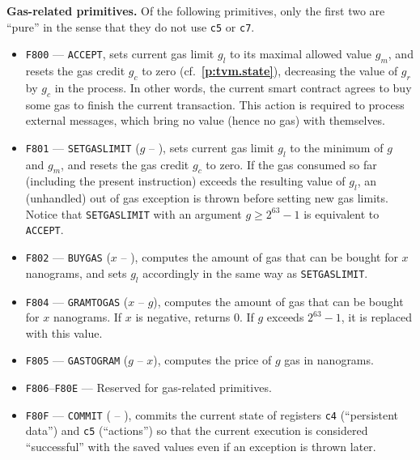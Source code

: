\documentclass[12pt,oneside]{article}
\def\makepoint#1{\medbreak\noindent{\bf #1.\ }}
\def\nxsubpoint{\refstepcounter{subsubsection}%
  \smallbreak\makepoint{\thesubsubsection}}
\def\refpoint#1{{\rm\textbf{\ref{#1}}}}
\let\ptref=\refpoint
\def\emb#1{\textbf{#1.}}
\begin{document}
\nxsubpoint\emb{Gas-related primitives}
Of the following primitives, only the first two are ``pure'' in the sense that they do not use {\tt c5} or {\tt c7}.
\begin{itemize}
\item {\tt F800} --- {\tt ACCEPT}, sets current gas limit $g_l$ to its maximal allowed value $g_m$, and resets the gas credit $g_c$ to zero (cf.~\ptref{p:tvm.state}), decreasing the value of $g_r$ by $g_c$ in the process. In other words, the current smart contract agrees to buy some gas to finish the current transaction. This action is required to process external messages, which bring no value (hence no gas) with themselves.
\item {\tt F801} --- {\tt SETGASLIMIT} ($g$ -- ), sets current gas limit $g_l$ to the minimum of $g$ and $g_m$, and resets the gas credit $g_c$ to zero. If the gas consumed so far (including the present instruction) exceeds the resulting value of $g_l$, an (unhandled) out of gas exception is thrown before setting new gas limits. Notice that {\tt SETGASLIMIT} with an argument $g\geq 2^{63}-1$ is equivalent to {\tt ACCEPT}.
\item {\tt F802} --- {\tt BUYGAS} ($x$ -- ), computes the amount of gas that can be bought for $x$ nanograms, and sets $g_l$ accordingly in the same way as {\tt SETGASLIMIT}.
\item {\tt F804} --- {\tt GRAMTOGAS} ($x$ -- $g$), computes the amount of gas that can be bought for $x$ nanograms. If $x$ is negative, returns 0. If $g$ exceeds $2^{63}-1$, it is replaced with this value.
\item {\tt F805} --- {\tt GASTOGRAM} ($g$ -- $x$), computes the price of $g$ gas in nanograms.
\item {\tt F806}--{\tt F80E} --- Reserved for gas-related primitives.
\item {\tt F80F} --- {\tt COMMIT} ( -- ), commits the current state of registers {\tt c4} (``persistent data'') and {\tt c5} (``actions'') so that the current execution is considered ``successful'' with the saved values even if an exception is thrown later.
\end{itemize}
\end{document}
